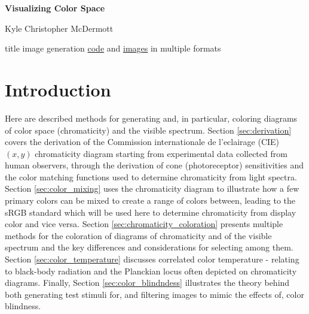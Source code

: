 \documentclass{article}
\begin{document}

\begin{titlepage}
    \BgThispage
    \begin{center}
        \vspace*{1cm}
        \Huge\textbf{Visualizing Color Space}\normalsize
        
        \vspace{0.5cm}
        
        Kyle Christopher McDermott
        
        \vfill
        
        \footnotesize title image generation \href{https://github.com/kyle-c-mcdermott/visualizing-color-space/blob/main/generation/figure_00_title_background.py}{code} and \href{https://drive.google.com/drive/folders/1t8u78MGT62_38VECX3C_MshAZTZv9OGP?usp=sharing}{images} in multiple formats \normalsize
        
    \end{center}
    \thispagestyle{empty} %
\end{titlepage}



\section{Introduction}

Here are described methods for generating and, in particular, coloring diagrams of color space (chromaticity) and the visible spectrum.  Section \ref{sec:derivation} covers the derivation of the Commission internationale de l'eclairage (CIE) $(x,y)$ chromaticity diagram starting from experimental data collected from human observers, through the derivation of cone (photoreceptor) sensitivities and the color matching functions used to determine chromaticity from light spectra.  Section \ref{sec:color_mixing} uses the chromaticity diagram to illustrate how a few primary colors can be mixed to create a range of colors between, leading to the sRGB standard which will be used here to determine chromaticity from display color and vice versa.  Section \ref{sec:chromaticity_coloration} presents multiple methods for the coloration of diagrams of chromaticity and of the visible spectrum and the key differences and considerations for selecting among them.  Section \ref{sec:color_temperature} discusses correlated color temperature - relating to black-body radiation and the Planckian locus often depicted on chromaticity diagrams.  Finally, Section \ref{sec:color_blindndess} illustrates the theory behind both generating test stimuli for, and filtering images to mimic the effects of, color blindness.
\end{document}
